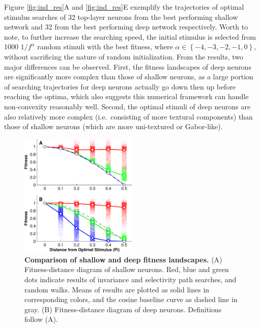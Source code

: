 \begin{FPfigure}
\label{fig:ind_res}
\end{FPfigure} %

Figure \ref{fig:ind_res}A and \ref{fig:ind_res}E exemplify the trajectories of optimal stimulus searches of 32 top-layer neurons from the best performing shallow network and 32 from the best performing deep network respectively. Worth to note, to further increase the searching speed, the initial stimulus is selected from 1000 ${1}/{f^{\alpha}}$ random stimuli with the best fitness, where $\alpha \in \left\lbrace -4,-3,-2,-1,0 \right\rbrace$, without sacrificing the nature of random initialization. From the results, two major differences can be observed. First, the fitness landscapes of deep neurons are significantly more complex than those of shallow neurons, as a large portion of searching trajectories for deep neurons actually go down then up before reaching the optima, which also suggests this numerical framework can handle non-convexity reasonably well. Second, the optimal stimuli of deep neurons are also relatively more complex (i.e.~consisting of more textural components) than those of shallow neurons (which are more uni-textured or Gabor-like).


\begin{figure}
\centering \includegraphics[width=0.5\textwidth]{Figs/e_fig3a_2-nup-crop.pdf}
\caption{
{\bf Comparison of shallow and deep fitness landscapes.} (A) Fitness-distance diagram of shallow neurons. Red, blue and green dots indicate results of invariance and selectivity path searches, and random walks. Means of results are plotted as solid lines in corresponding colors, and the cosine baseline curve as dashed line in gray. (B) Fitness-distance diagram of deep neurons. Definitions follow (A).}
\label{fig:ind_fdd} %
\end{figure}

